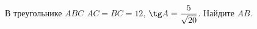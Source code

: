 \begin{ex}
	\begin{condition}
		В треугольнике \(ABC\) \( AC=BC=12 \),  \( \tg A=\dfrac{5}{\sqrt{20}} \).  Найдите \( AB \).
	\end{condition}
\end{ex}